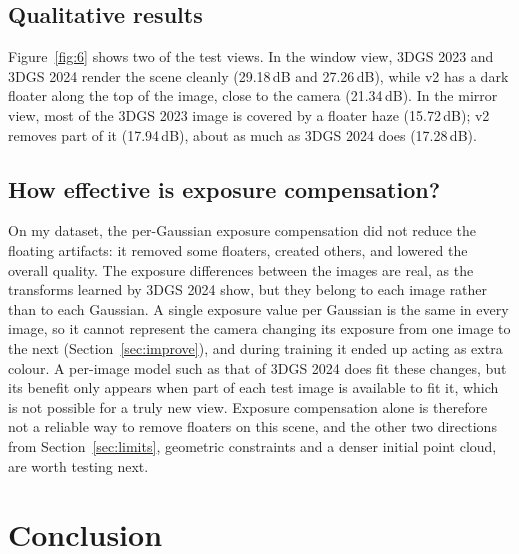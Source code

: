 \documentclass[11pt,a4paper]{article}
\begin{document}
\subsection{Qualitative results}

Figure~\ref{fig:6} shows two of the test views. In the window view, 3DGS 2023 and 3DGS 2024 render the scene cleanly (29.18\,dB and 27.26\,dB), while v2 has a dark floater along the top of the image, close to the camera (21.34\,dB). In the mirror view, most of the 3DGS 2023 image is covered by a floater haze (15.72\,dB); v2 removes part of it (17.94\,dB), about as much as 3DGS 2024 does (17.28\,dB).

\subsection{How effective is exposure compensation?}

On my dataset, the per-Gaussian exposure compensation did not reduce the floating artifacts: it removed some floaters, created others, and lowered the overall quality. The exposure differences between the images are real, as the transforms learned by 3DGS 2024 show, but they belong to each image rather than to each Gaussian. A single exposure value per Gaussian is the same in every image, so it cannot represent the camera changing its exposure from one image to the next (Section~\ref{sec:improve}), and during training it ended up acting as extra colour. A per-image model such as that of 3DGS 2024 does fit these changes, but its benefit only appears when part of each test image is available to fit it, which is not possible for a truly new view. Exposure compensation alone is therefore not a reliable way to remove floaters on this scene, and the other two directions from Section~\ref{sec:limits}, geometric constraints and a denser initial point cloud, are worth testing next.

\section{Conclusion}
\end{document}
